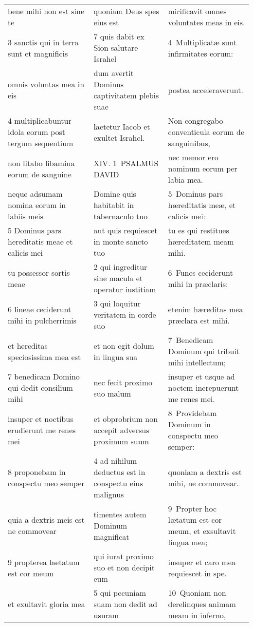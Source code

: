 \documentclass{article}
\begin{document}
\begin{longtable}{@{}p{}p{}p{}@{}}
bene mihi non est sine te	&	quoniam Deus spes eius est	&	mirificavit omnes voluntates meas in eis.	\\
3 sanctis qui in terra sunt et magnificis	&	7 quis dabit ex Sion salutare Israhel	&	4 Multiplicatæ sunt infirmitates eorum:	\\
omnis voluntas mea in eis	&	dum avertit Dominus captivitatem plebis suae	&	postea acceleraverunt.	\\
4 multiplicabuntur idola eorum post tergum sequentium	&	laetetur Iacob et exultet Israhel.	&	Non congregabo conventicula eorum de sanguinibus,	\\
non litabo libamina eorum de sanguine	&	XIV. 1 PSALMUS DAVID	&	nec memor ero nominum eorum per labia mea.	\\
neque adsumam nomina eorum in labiis meis	&	Domine quis habitabit in tabernaculo tuo	&	5 Dominus pars hæreditatis meæ, et calicis mei:	\\
5 Dominus pars hereditatis meae et calicis mei	&	aut quis requiescet in monte sancto tuo	&	tu es qui restitues hæreditatem meam mihi.	\\
tu possessor sortis meae	&	2 qui ingreditur sine macula et operatur iustitiam	&	6 Funes ceciderunt mihi in præclaris;	\\
6 lineae ceciderunt mihi in pulcherrimis	&	3 qui loquitur veritatem in corde suo	&	etenim hæreditas mea præclara est mihi.	\\
et hereditas speciosissima mea est	&	et non egit dolum in lingua sua	&	7 Benedicam Dominum qui tribuit mihi intellectum;	\\
7 benedicam Domino qui dedit consilium mihi	&	nec fecit proximo suo malum	&	insuper et usque ad noctem increpuerunt me renes mei.	\\
insuper et noctibus erudierunt me renes mei	&	et obprobrium non accepit adversus proximum suum	&	8 Providebam Dominum in conspectu meo semper:	\\
8 proponebam in conspectu meo semper	&	4 ad nihilum deductus est in conspectu eius malignus	&	quoniam a dextris est mihi, ne commovear.	\\
quia a dextris meis est ne commovear	&	timentes autem Dominum magnificat	&	9 Propter hoc lætatum est cor meum, et exsultavit lingua mea;	\\
9 propterea laetatum est cor meum	&	qui iurat proximo suo et non decipit eum	&	insuper et caro mea requiescet in spe.	\\
et exultavit gloria mea	&	5 qui pecuniam suam non dedit ad usuram	&	10 Quoniam non derelinques animam meam in inferno,	\\

\end{longtable}
\end{document}
